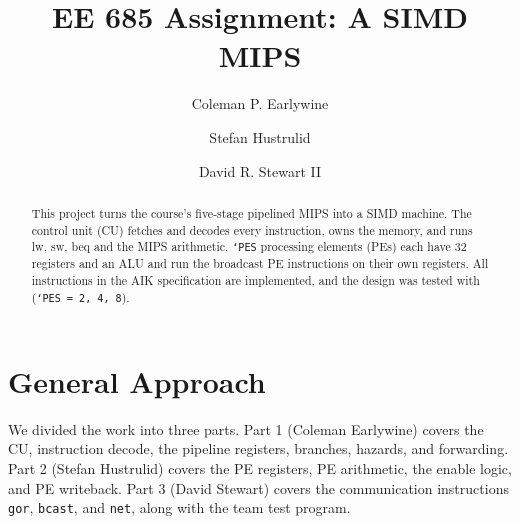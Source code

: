 \documentclass[sigconf,nonacm]{acmart}
\begin{document}
\title{EE 685 Assignment: A SIMD MIPS}


\author{
        Coleman P. Earlywine
}

\author{
        Stefan Hustrulid
}

\author{
        David R. Stewart II
}


\begin{abstract}
This project turns the course's five-stage pipelined MIPS into a SIMD machine. The control unit (CU) fetches and decodes every instruction, owns the memory, and runs lw, sw, beq and the MIPS arithmetic. \texttt{`PES} processing elements (PEs) each have 32 registers and an ALU and run the broadcast PE instructions on their own registers. All instructions in the AIK specification are implemented, and the design was tested with (\texttt{`PES = 2, 4, 8}).

\end{abstract}

\maketitle

\section{General Approach}
We divided the work into three parts. Part 1 (Coleman Earlywine) covers the CU, instruction decode, the pipeline registers, branches, hazards, and forwarding. Part 2 (Stefan Hustrulid) covers the PE registers, PE arithmetic, the enable logic, and PE writeback. Part 3 (David Stewart) covers the communication instructions \texttt{gor}, \texttt{bcast}, and \texttt{net}, along with the team test program.
\end{document}
